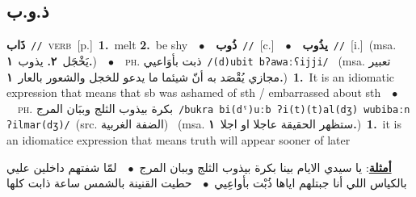 \documentclass[10pt,a4paper,twoside]{article} %
\begin{document}
\begin{multicols}{2}
\vspace{-3mm}
\subsection*{\color{blue}\foreignlanguage{arabic}{ذ.و.ب}\color{blue}{}} 

{\setlength\topsep{0pt}\textbf{\foreignlanguage{arabic}{ذَاب}}\ {\color{gray}\texttt{//}\color{black}}\ \textsc{verb}\ [p.]\ \textbf{1.}~melt  \textbf{2.}~be shy\ \ $\bullet$\ \ \setlength\topsep{0pt}\textbf{\foreignlanguage{arabic}{ذُوب}}\ {\color{gray}\texttt{//}\color{black}}\ [c.]\ \ $\bullet$\ \ \setlength\topsep{0pt}\textbf{\foreignlanguage{arabic}{يذُوب}}\ {\color{gray}\texttt{//}\color{black}}\ [i.]\ \color{gray}(msa. \foreignlanguage{arabic}{يَخْجَل}~\foreignlanguage{arabic}{\textbf{٢.}}  \foreignlanguage{arabic}{يذوب}~\foreignlanguage{arabic}{\textbf{١.}})\color{black}\ \ $\bullet$\ \ \textsc{ph.} \color{gray} \foreignlanguage{arabic}{ذبت بأوَاعيي}\color{black}\ {\color{gray}\texttt{/{\sffamily (d)ubit bʔawaːʕijji}/}\color{black}}\ \color{gray} (msa. \foreignlanguage{arabic}{تعبير مجازي يُقْصَد به أنّ شيئما ما يدعو للخجل والشعور بالعار}~\foreignlanguage{arabic}{\textbf{١.}})\color{black}\ \textbf{1.}~It is an idiomatic expression that means that sb was ashamed of sth / embarrassed about sth\ \ $\bullet$\ \ \textsc{ph.} \color{gray} \foreignlanguage{arabic}{بكرة بيذوب الثلج وببَان المرج}\color{black}\ {\color{gray}\texttt{/{\sffamily bukra bi(dˤ)uːb ʔi(t)(t)al(dʒ) wubibaːn ʔilmar(dʒ)}/}\color{black}}\ \color{gray}(src. \foreignlanguage{arabic}{الضفة الغربية})\color{black}\ \color{gray} (msa. \foreignlanguage{arabic}{ستظهر الحقيقة عاجلا او اجلا}~\foreignlanguage{arabic}{\textbf{١.}})\color{black}\ \textbf{1.}~it is an idiomatice expression that means truth will appear sooner of later\  \begin{flushright}\color{gray}\foreignlanguage{arabic}{\textbf{\underline{\foreignlanguage{arabic}{أمثلة}}}: يا سيدي الايام بينا بكرة بيذوب الثلج وببان المرج\ $\bullet$\ \  لمّا شفتهم داخلين عليي بالكياس اللي أنا جبتلهم اياها ذُبْت بأواعِيي\ $\bullet$\ \  حطيت القنينة بالشمس ساعة ذابت كلها}\end{flushright}\color{black}} \vspace{2mm}


\end{multicols}
\end{document}
